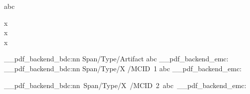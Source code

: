 \documentclass[10pt]{article}
\begin{document}
abc

\vspace{44\baselineskip}

x\\x\\x\\
\ExplSyntaxOn

\__pdf_backend_bdc:nn {Span}{/Type/Artifact}
abc
\__pdf_backend_emc:
\__pdf_backend_bdc:nn {Span}{/Type/X /MCID~1}
abc
\__pdf_backend_emc:

\mbox{\__pdf_backend_bdc:nn {Span}{/Type/X /MCID~2}
abc
\__pdf_backend_emc:}

\ExplSyntaxOff
\end{document}
